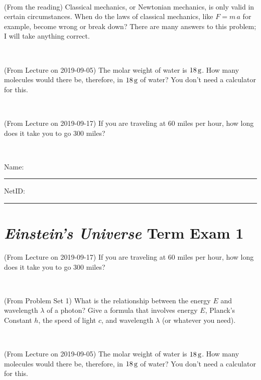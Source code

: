 \documentclass[12pt, letterpaper]{article}
\begin{document}
\vfill ~

\begin{problem} (From the reading)
Classical mechanics, or Newtonian mechanics, is only valid in certain
circumstances. When do the laws of classical mechanics, like $F =
m\,a$ for example, become wrong or break down? There are many answers
to this problem; I will take anything correct.
\end{problem}


\vfill ~

\begin{problem} (From Lecture on 2019-09-05)
The molar weight of water is $18\,\mathrm{g}$. How many molecules would there
be, therefore, in $18\,\mathrm{g}$ of water? You don't need a calculator for
this.
\end{problem}


\vfill ~

\begin{problem} (From Lecture on 2019-09-17)
If you are traveling at 60 miles per hour, how long does
it take you to go 300 miles?
\end{problem}


\vfill ~


\cleardoublepage



\noindent
Name: \rule[-1ex]{0.60\textwidth}{0.1pt}
NetID: \rule[-1ex]{0.20\textwidth}{0.1pt}

\section*{\textsl{Einstein's Universe} Term Exam 1}
\setcounter{problem}{1}


\begin{problem} (From Lecture on 2019-09-17)
If you are traveling at 60 miles per hour, how long does
it take you to go 300 miles?
\end{problem}


\vfill ~

\begin{problem} (From Problem Set 1)
What is the relationship between the energy $E$ and wavelength
$\lambda$ of a photon? Give a formula that involves energy $E$,
Planck's Constant $h$, the speed of light $c$, and wavelength
$\lambda$ (or whatever you need).
\end{problem}

\vfill ~

\begin{problem} (From Lecture on 2019-09-05)
The molar weight of water is $18\,\mathrm{g}$. How many molecules would there
be, therefore, in $18\,\mathrm{g}$ of water? You don't need a calculator for
this.
\end{problem}
\end{document}
